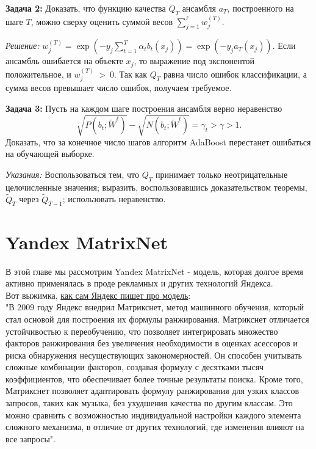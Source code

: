 \textbf{Задача 2:} Доказать, что функцию качества $Q_{T}$ ансамбля $a_{T}$, построенного на шаге $T$, можно сверху оценить суммой весов $\sum_{j=1}^\ell w_j^{(T)}$.

\textit{Решение:} $w_j^{(T)}={\exp \left(-y_j \sum_{t=1}^{T} \alpha_t b_t\left(x_j\right)\right)}={\exp \left(-y_j a_T\left(x_j\right)\right)}$. Если ансамбль ошибается на объекте $x_j$, то выражение под экспонентой положительное, и $w_j^{(T)}~>~0$. Так как $Q_T$ равна число ошибок классификации, а сумма весов превышает число ошибок, получаем требуемое.

\textbf{Задача 3:} Пусть на каждом шаге построения ансамбля верно неравенство
\begin{equation*}
    \sqrt{P\left(b_t ; \widetilde{W}^{\ell}\right)}-\sqrt{N\left(b_t ; \widetilde{W}^{\ell}\right)}=\gamma_t>\gamma>1.
\end{equation*}
Доказать, что за конечное число шагов алгоритм AdaBoost перестанет ошибаться на обучающей выборке.

\textit{Указания:} Воспользоваться тем, что $Q_T$ принимает только неотрицательные целочисленные значения; выразить, воспользовавшись доказательством теоремы, $\widetilde{Q}_{T}$ через $\widetilde{Q}_{T-1}$; использовать неравенство.

\section{Yandex MatrixNet}
В этой главе мы рассмотрим Yandex MatrixNet - модель, которая долгое время активно применялась в проде рекламных и других технологий Яндекса. \\
Вот выжимка, \href{https://yandex.ru/company/technologies/matrixnet/}{как сам Яндекс пишет про модель}:\\
"В 2009 году Яндекс внедрил Матрикснет, метод машинного обучения, который стал основой для построения их формулы ранжирования. 
Матрикснет отличается устойчивостью к переобучению, что позволяет интегрировать множество факторов ранжирования без увеличения необходимости в оценках асессоров и риска обнаружения несуществующих закономерностей. 
Он способен учитывать сложные комбинации факторов, создавая формулу с десятками тысяч коэффициентов, что обеспечивает более точные результаты поиска. Кроме того, Матрикснет позволяет адаптировать формулу ранжирования для узких классов запросов, таких как музыка, 
без ухудшения качества по другим классам. Это можно сравнить с возможностью индивидуальной настройки каждого элемента сложного механизма, в отличие от других технологий, где изменения влияют на все запросы".

